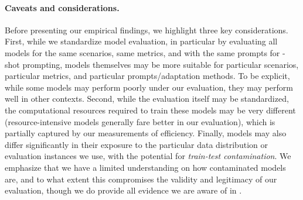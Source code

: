 \paragraph{Caveats and considerations.}
Before presenting our empirical findings, we highlight three key considerations.
First, while we standardize model evaluation, in particular by evaluating all models for the same scenarios, same metrics, and with the same prompts for \numincontext-shot prompting, models themselves may be more suitable for particular scenarios, particular metrics, and particular prompts/adaptation methods. 
To be explicit, while some models may perform poorly under our evaluation, they may perform well in other contexts.
Second, while the evaluation itself may be standardized, the computational resources required to train these models may be very different (\eg resource-intensive models generally fare better in our evaluation), which is partially captured by our measurements of efficiency.
Finally, models may also differ significantly in their exposure to the particular data distribution or evaluation instances we use, with the potential for \textit{train-test contamination}.
We emphasize that we have a limited understanding on how contaminated models are, and to what extent this compromises the validity and legitimacy of our evaluation, though we do provide all evidence we are aware of in . 


